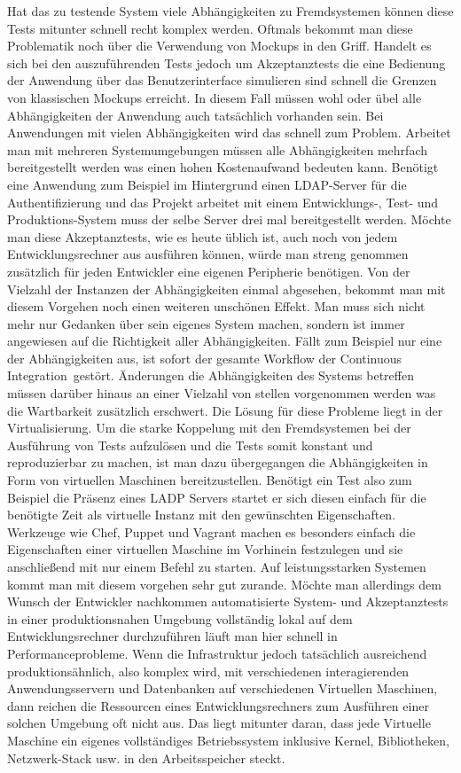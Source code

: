 Hat das zu testende System viele Abhängigkeiten zu Fremdsystemen können diese Tests mitunter schnell recht komplex werden. Oftmals bekommt man diese Problematik noch über die Verwendung von Mockups in den Griff. Handelt es sich bei den auszuführenden Tests jedoch um Akzeptanztests die eine Bedienung der Anwendung über das Benutzerinterface simulieren sind schnell die Grenzen von klassischen Mockups erreicht.
In diesem Fall müssen wohl oder übel alle Abhängigkeiten der Anwendung auch tatsächlich vorhanden sein. Bei Anwendungen mit vielen Abhängigkeiten wird das schnell zum Problem.
Arbeitet man mit mehreren Systemumgebungen müssen alle Abhängigkeiten mehrfach bereitgestellt werden was einen hohen Kostenaufwand bedeuten kann.
Benötigt eine Anwendung zum Beispiel im Hintergrund einen LDAP-Server für die Authentifizierung und das Projekt arbeitet mit einem Entwicklungs-, Test- und Produktions-System muss der selbe Server drei mal bereitgestellt werden.
Möchte man diese Akzeptanztests, wie es heute üblich ist, auch noch von jedem Entwicklungsrechner aus ausführen können, würde man streng genommen zusätzlich für jeden Entwickler eine eigenen Peripherie benötigen.
Von der Vielzahl der Instanzen der Abhängigkeiten einmal abgesehen, bekommt man mit diesem Vorgehen noch einen weiteren unschönen Effekt.
Man muss sich nicht mehr nur Gedanken über sein eigenes System machen, sondern ist immer angewiesen auf die Richtigkeit aller Abhängigkeiten.
Fällt zum Beispiel nur eine der Abhängigkeiten aus, ist sofort der gesamte Workflow der \grq Continuous Integration\grq\ gestört.
Änderungen die Abhängigkeiten des Systems betreffen müssen darüber hinaus an einer Vielzahl von stellen vorgenommen werden was die Wartbarkeit zusätzlich erschwert.
Die Lösung für diese Probleme liegt in der Virtualisierung.
Um die starke Koppelung mit den Fremdsystemen bei der Ausführung von Tests aufzulösen und die Tests somit konstant und reproduzierbar zu machen, ist man dazu übergegangen die Abhängigkeiten in Form von virtuellen Maschinen bereitzustellen.
Benötigt ein Test also zum Beispiel die Präsenz eines LADP Servers startet er sich diesen einfach für die benötigte Zeit als virtuelle Instanz mit den gewünschten Eigenschaften.
Werkzeuge wie Chef, Puppet und Vagrant machen es besonders einfach die Eigenschaften einer virtuellen Maschine im Vorhinein festzulegen und sie anschließend mit nur einem Befehl zu starten.
Auf leistungsstarken Systemen kommt man mit diesem vorgehen sehr gut zurande. Möchte man allerdings dem Wunsch der Entwickler nachkommen automatisierte System- und Akzeptanztests in einer produktionsnahen Umgebung vollständig lokal auf dem Entwicklungsrechner durchzuführen läuft man hier schnell in Performanceprobleme.
\glqq Wenn die Infrastruktur jedoch tatsächlich ausreichend produktionsähnlich, also komplex wird, mit verschiedenen interagierenden Anwendungsservern und Datenbanken auf verschiedenen Virtuellen Maschinen, dann reichen die Ressourcen eines Entwicklungsrechners zum Ausführen einer solchen Umgebung oft nicht aus. Das liegt mitunter daran, dass jede Virtuelle Maschine ein eigenes vollständiges Betriebssystem inklusive Kernel, Bibliotheken, Netzwerk-Stack usw. in den Arbeitsspeicher steckt.\grqq \cite{holbreich_von_2014}


